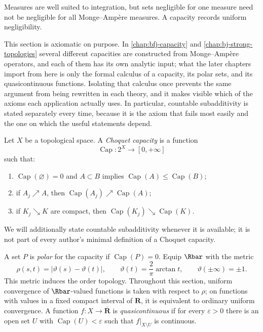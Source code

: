 Measures are well suited to integration, but sets negligible for one measure
need not be negligible for all Monge--Amp\`ere measures.  A capacity records
uniform negligibility.

This section is axiomatic on purpose.  In \cref{chap:bfj-capacity} and
\cref{chap:bj-strong-topologies} several different capacities are constructed
from Monge--Amp\`ere operators, and each of them has its own analytic
input; what the later chapters import from here is only the formal calculus of
a capacity, its polar sets, and its quasicontinuous functions.  Isolating that
calculus once prevents the same argument from being rewritten in each theory,
and it makes visible which of the axioms each application actually uses.  In
particular, countable subadditivity is stated separately every time, because
it is the axiom that fails most easily and the one on which the useful
statements depend.

\begin{definition}
\label{def:choquet-capacity}
Let $X$ be a topological space.  A \emph{Choquet capacity} is a function
\[
                 \operatorname{Cap}:2^X\longrightarrow[0,+\infty]
\]
such that:
\begin{enumerate}
\item $\operatorname{Cap}(\varnothing)=0$ and
  $A\subset B$ implies $\operatorname{Cap}(A)\leq\operatorname{Cap}(B)$;
\item if $A_j\nearrow A$, then
  $\operatorname{Cap}(A_j)\nearrow\operatorname{Cap}(A)$;
\item if $K_j\searrow K$ are compact, then
  $\operatorname{Cap}(K_j)\searrow\operatorname{Cap}(K)$.
\end{enumerate}
We will additionally state countable subadditivity whenever it is available;
it is not part of every author's minimal definition of a Choquet capacity.
\end{definition}

A set $P$ is \emph{polar} for the capacity if
$\operatorname{Cap}(P)=0$.  Equip $\Rbar$ with the metric
\[
 \rho(s,t)=|\vartheta(s)-\vartheta(t)|,
 \qquad
 \vartheta(t)=\frac{2}{\pi}\arctan t,
 \qquad
 \vartheta(\pm\infty)=\pm1.
\]
This metric induces the order topology.  Throughout this section, uniform
convergence of $\Rbar$-valued functions is taken with respect to $\rho$; on
functions with values in a fixed compact interval of $\mathbf R$, it is
equivalent to ordinary uniform convergence.  A function
$f:X\to\overline{\mathbf R}$ is
\emph{quasicontinuous} if for every $\varepsilon>0$ there is an open set $U$
with $\operatorname{Cap}(U)<\varepsilon$ such that
$f|_{X\setminus U}$ is continuous.

